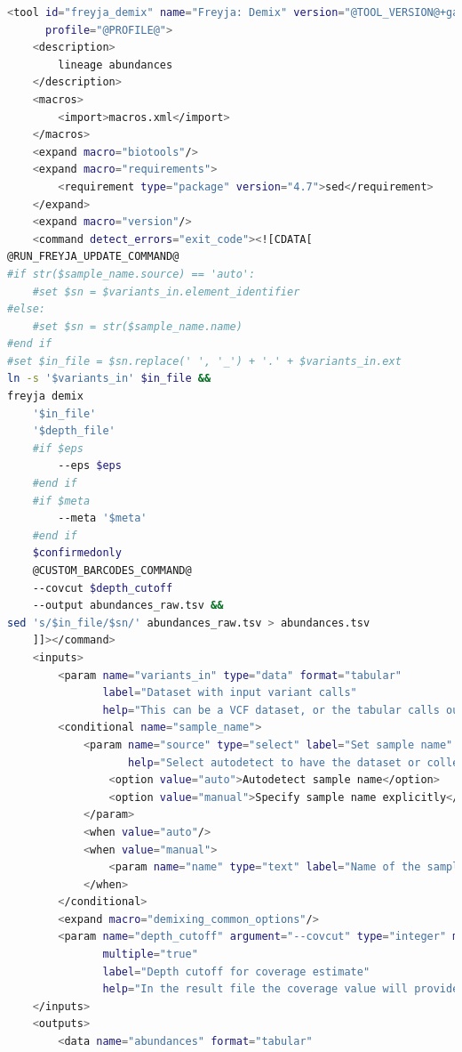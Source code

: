 \begin{lstlisting}[language=bash, caption=tool wrapper for Freyja: Demix lineage abundances, label=list:methods:wrapper-freyja-demix]
<tool id="freyja_demix" name="Freyja: Demix" version="@TOOL_VERSION@+galaxy@VERSION_SUFFIX@"
      profile="@PROFILE@">
    <description>
        lineage abundances
    </description>
    <macros>
        <import>macros.xml</import>
    </macros>
    <expand macro="biotools"/>
    <expand macro="requirements">
        <requirement type="package" version="4.7">sed</requirement>
    </expand>
    <expand macro="version"/>
    <command detect_errors="exit_code"><![CDATA[
@RUN_FREYJA_UPDATE_COMMAND@
#if str($sample_name.source) == 'auto':
    #set $sn = $variants_in.element_identifier
#else:
    #set $sn = str($sample_name.name)
#end if
#set $in_file = $sn.replace(' ', '_') + '.' + $variants_in.ext
ln -s '$variants_in' $in_file &&
freyja demix
    '$in_file'
    '$depth_file'
    #if $eps
        --eps $eps
    #end if
    #if $meta
        --meta '$meta'
    #end if
    $confirmedonly
    @CUSTOM_BARCODES_COMMAND@
    --covcut $depth_cutoff
    --output abundances_raw.tsv &&
sed 's/$in_file/$sn/' abundances_raw.tsv > abundances.tsv
    ]]></command>
    <inputs>
        <param name="variants_in" type="data" format="tabular"
               label="Dataset with input variant calls"
               help="This can be a VCF dataset, or the tabular calls output of freayja call or ivar variants."/>
        <conditional name="sample_name">
            <param name="source" type="select" label="Set sample name"
                   help="Select autodetect to have the dataset or collection element name used as the sample name, or, for a single input dataset, provide an explicit sample name.">
                <option value="auto">Autodetect sample name</option>
                <option value="manual">Specify sample name explicitly</option>
            </param>
            <when value="auto"/>
            <when value="manual">
                <param name="name" type="text" label="Name of the sample"/>
            </when>
        </conditional>
        <expand macro="demixing_common_options"/>
        <param name="depth_cutoff" argument="--covcut" type="integer" min="0" value="10"
               multiple="true"
               label="Depth cutoff for coverage estimate"
               help="In the result file the coverage value will provide the 10x coverage estimate (percent of sites with 10 or greater reads- 10 is the default but can be modfied in this field. "/>
    </inputs>
    <outputs>
        <data name="abundances" format="tabular"

\end{lstlisting}
